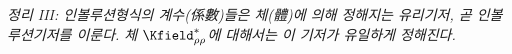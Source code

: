 
\emph{정리 III: 인볼루션형식의 계수(係數)들은 체(體)에 의해 정해지는 유리기저, 곧 인볼루션기저를 이룬다. 체 $\Kfield^*_{\rho\rho}$에 대해서는 이 기저가 유일하게 정해진다.}
